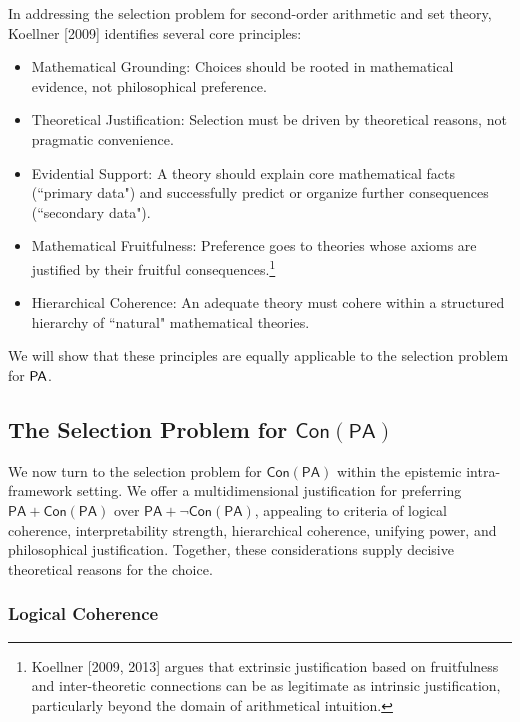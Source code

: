 \documentclass[a4paper,12pt]{amsart}
\theoremstyle{definition}
\numberwithin{equation}{section}
\begin{document}
In addressing the selection problem for second-order arithmetic and set theory, Koellner [2009] identifies several core principles:
\begin{itemize}
  \item Mathematical Grounding: Choices should be rooted in mathematical evidence, not philosophical preference.
  \item Theoretical Justification: Selection must be driven by theoretical reasons, not pragmatic convenience.
  \item Evidential Support: A theory should explain core mathematical facts (``primary data") and successfully predict or organize further consequences (``secondary data").
\item Mathematical Fruitfulness: Preference goes to theories whose axioms are justified by their fruitful consequences.\footnote{Koellner [2009, 2013] argues that extrinsic justification based on fruitfulness and inter-theoretic connections can be as legitimate as intrinsic justification, particularly beyond the domain of arithmetical intuition.}
\item Hierarchical Coherence: An adequate theory must cohere within a structured hierarchy of ``natural" mathematical theories. 
\end{itemize}

We will show that these principles are equally applicable to the selection problem for ${\sf PA}$.  


\subsection{The Selection Problem for $\mathsf{Con(PA)}$}\label{sec for Con}



We now turn to the selection problem for \(\mathsf{Con(PA)}\) within the epistemic intra-framework setting. We offer a multidimensional justification for preferring \(\mathsf{PA}+\mathsf{Con(PA)}\) over \(\mathsf{PA}+\neg\mathsf{Con(PA)}\), appealing to criteria of logical coherence, interpretability strength, hierarchical coherence, unifying power, and philosophical justification. Together, these considerations supply decisive theoretical reasons for the choice.


                           
                           
\subsubsection{Logical Coherence}
\end{document}

